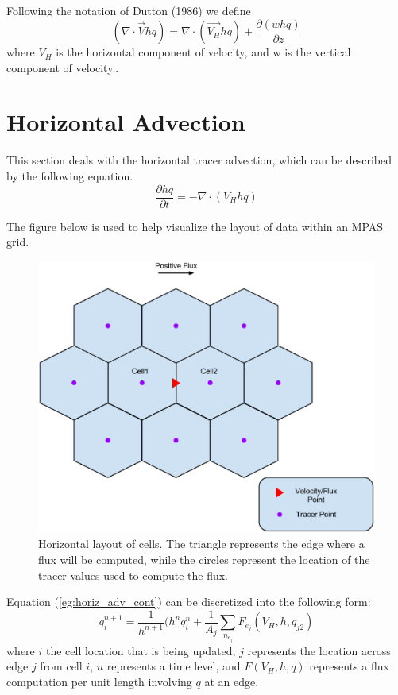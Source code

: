 \documentclass[11pt]{report}
\begin{document}
Following the notation of Dutton (1986) we define
\begin{equation}
	(\nabla \cdot \vec{V} h q) = \nabla \cdot (\vec{V_H} h q) + \frac{\partial (w h q)}{\partial z}
\end{equation}
where $V_H$ is the horizontal component of velocity, and w is the vertical component of velocity..

\section{Horizontal Advection}
This section deals with the horizontal tracer advection, which can be described by the following equation.
\begin{equation}
	\frac{\partial h q}{\partial t} = - \nabla \cdot (V_H h q)
	\label{eg:horiz_adv_cont}
\end{equation}

The figure below is used to help visualize the layout of data within an MPAS grid.
\begin{figure}[H]
	\centering
	\includegraphics[scale=0.5]{HorizontalFluxDiagram.eps}
	\caption{Horizontal layout of cells. The triangle represents the edge where a flux will be computed, while the circles represent the location of the tracer values used to compute the flux.}
\end{figure}

Equation (\ref{eg:horiz_adv_cont}) can be discretized into the following form:
\begin{equation}
	q_i^{n+1} = \frac{1}{h^{n+1}}(h^n q_i^{n} + \frac{1}{A_j}\sum_{n_{e_j}} F_{e_j}(V_H, h, q_{j2})
\end{equation}
where $i$ the cell location that is being updated, $j$ represents the location across edge $j$ from cell $i$, $n$ represents a time level, and $F(V_H, h, q)$ represents a flux computation per unit length involving $q$ at an edge.
\end{document}
